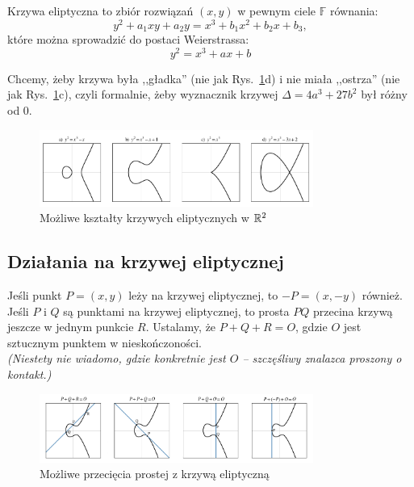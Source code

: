 \begin{definition}
	Krzywa eliptyczna to zbiór rozwiązań \( (x, y) \) w pewnym ciele \( \mathbb{F} \) równania:
	\[
		y^2 + a_1xy + a_2y = x^3 + b_1x^2 + b_2x + b_3,
	\]
	które można sprowadzić do postaci Weierstrassa:
	\[
		y^2 = x^3 + ax + b
	\]
\end{definition}

Chcemy, żeby krzywa była ,,gładka'' (nie jak Rys.~\ref{fig:elliptic_curves}d) i nie miała ,,ostrza'' (nie jak Rys.~\ref{fig:elliptic_curves}c), czyli formalnie, żeby wyznacznik krzywej \( \Delta = 4a^3 + 27b^2 \) był różny od 0.

\begin{figure}[H]
	\centering
	\includegraphics[width=0.8\textwidth]{img/elliptic_curves}
	\caption{Możliwe kształty krzywych eliptycznych w \( \mathbb{R}^2 \)}
	\label{fig:elliptic_curves}
\end{figure}

\subsection{Działania na krzywej eliptycznej}
Jeśli punkt \( P = (x, y) \) leży na krzywej eliptycznej, to \( -P = (x, -y) \) również.
Jeśli \( P \) i \( Q \) są punktami na krzywej eliptycznej, to prosta \( PQ \) przecina krzywą jeszcze w jednym punkcie \( R \).
Ustalamy, że \( P + Q + R = O \), gdzie \( O \) jest sztucznym punktem w nieskończoności. \\
\textit{(Niestety nie wiadomo, gdzie konkretnie jest \( O \) -- szczęśliwy znalazca proszony o kontakt.)}

\begin{figure}[H]
	\centering
	\includegraphics[width=0.8\textwidth]{img/elliptic_curves_lines}
	\caption{Możliwe przecięcia prostej z krzywą eliptyczną}
	\label{fig:elliptic_lines}
\end{figure}

